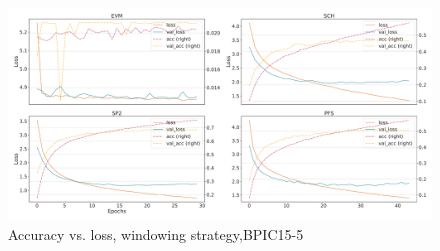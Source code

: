 \begin{figure}[!htb]
    \centering
    \includegraphics[width=\textwidth]{gfx/bpic2015_5/windowed_loss_acc_curve.pdf}
    \caption{Accuracy vs. loss, windowing strategy,BPIC15-5}
\end{figure}
\FloatBarrier
